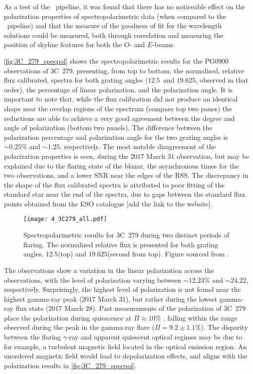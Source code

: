 As a test of the \stops\ pipeline, it was found that there has no noticeable effect on the polarization properties of spectropolarimetric data (when compared to the \polsalt\ pipeline) and that the measure of the goodness of fit for the wavelength solutions could be measured, both through correlation and measuring the position of skyline features for both the $O$- and $E$-beams. 

\autoref{fig:3C_279_specpol} shows the spectropolarimetric results for the PG0900 observations of  3C~$279$, presenting, from top to bottom, the normalized, relative flux calibrated, spectra for both grating angles ($12.5$\degree\ and $19.625$\degree, observed in that order), the percentage of linear polarization, and the polarization angle. It is important to note that, while the flux calibration did not produce an identical shape near the overlap regions of the spectrum (compare top two panes) the reductions are able to achieve a very good agreement between the degree and angle of polarization (bottom two panels). The difference between the polarization percentage and polarization angle for the two grating angles is $\sim 0.25\%$ and $\sim 1.25$\degree, respectively.
The most notable disagreement of the polarization properties is seen, during the $2017$ March $31$ observation, but may be explained due to the flaring state of the blazar, the asynchronous times for the two observations, and a lower \gls{SNR} near the edges of the \gls{RSS}. The discrepancy in the shape of the flux calibrated spectra is attributed to poor fitting of the standard star near the end of the spectra, due to gaps between the standard flux points obtained from the ESO catalogue [add the link to the website]. 

\begin{figure}[tp]
    \centering
    \texttt{[image: 4\_3C279\_all.pdf]}
    \caption{Spectropolarimetric results for 3C~$279$ during two distinct periods of flaring. The normalized relative flux is presented for both grating angles, $12.5$\degree (top) and $19.625$\degree (second from top). Figure sourced from \citep{Cooper_HEASA2022}.}
    \label{fig:3C_279_specpol}
\end{figure}


The observations show a variation in the linear polarization across the observations, with the level of polarization varying between $\sim 12.23\%$ and $\sim 24.22$\degree, respectively. Surprisingly, the highest level of polarization is not found near the highest gamma-ray peak (2017 March 31), but rather during the lowest gamma-ray flux state (2017 March 28).   Past measurements of the polarization of 3C~$279$ place the polarization during quiescence at $\Pi \approx 10 \%$ \citep[see e.g., ][]{3C279_xray}, falling within the range observed during the peak in the gamma-ray flare ($\Pi = 9.2 \pm 1.1\%$). The disparity between the flaring $\gamma$-ray and apparent quiescent optical regimes may be due to for example, a turbulent magnetic field located in the optical emission region.
An unordered magnetic field would lead to depolarization effects, and aligns with the polarization results in \autoref{fig:3C_279_specpol}.




